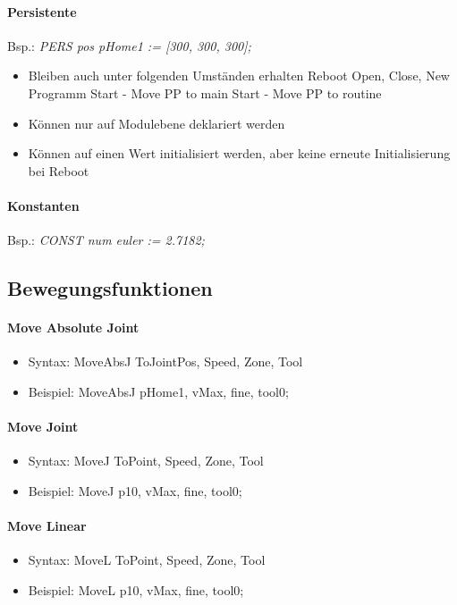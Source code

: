 \paragraph{Persistente}
Bsp.: \textit{PERS pos pHome1 := [300, 300, 300];}
\begin{itemize}
	\item Bleiben auch unter folgenden Umständen erhalten
	\subitem Reboot
	\subitem Open, Close, New Programm
	\subitem Start - Move PP to main
	\subitem Start - Move PP to routine
\end{itemize}
\begin{itemize}
	\item Können nur auf Modulebene deklariert werden
	\item Können auf einen Wert initialisiert werden, aber keine erneute Initialisierung bei Reboot
\end{itemize}
\paragraph{Konstanten}
Bsp.: \textit{CONST num euler := 2.7182;}
\subsection{Bewegungsfunktionen}
\paragraph{Move Absolute Joint}
\begin{itemize}
	\item Syntax: MoveAbsJ ToJointPos, Speed, Zone, Tool
	\item Beispiel: MoveAbsJ pHome1, vMax, fine, tool0;
\end{itemize}
\paragraph{Move Joint}
\begin{itemize}
	\item Syntax: MoveJ ToPoint, Speed, Zone, Tool
	\item Beispiel: MoveJ p10, vMax, fine, tool0;
\end{itemize}
\paragraph{Move Linear}
\begin{itemize}
	\item Syntax: MoveL ToPoint, Speed, Zone, Tool
	\item Beispiel: MoveL p10, vMax, fine, tool0;
\end{itemize}
